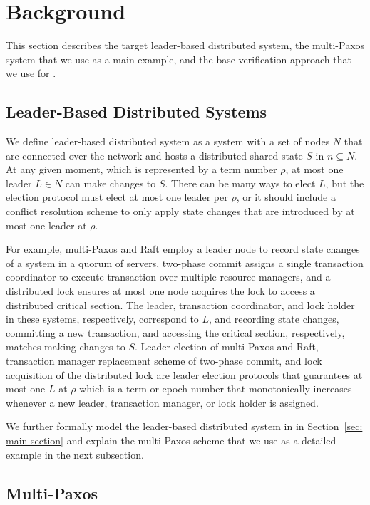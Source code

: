 \section{Background}
\label{sec:background}

This section describes the target leader-based distributed system, the
multi-Paxos system that we use as a main example, and the base
verification approach that we use for \sysname{}. 

\subsection{Leader-Based Distributed Systems}

We define leader-based distributed system as a system with a set of nodes $N$ that are
connected over the network and hosts a distributed shared state $S$ in $n
\subseteq N$. At any given moment, which is represented by a term number $\rho$,
at most one leader $L \in N$ can make changes to $S$. There can be many ways to elect
$L$, but the election protocol must elect at most one leader per $\rho$,
or it should include a conflict resolution scheme to only apply state changes
that are introduced by at most one leader at $\rho$.

For example, multi-Paxos and Raft employ a leader node to record state changes
of a system in a quorum of servers, two-phase commit assigns a single
transaction coordinator to execute transaction over multiple
resource managers, and a distributed lock ensures at most one node acquires the 
lock to access a distributed critical section.
The leader, transaction coordinator, and lock holder in
these systems, respectively, correspond to $L$, and recording state changes,
committing a new transaction, and accessing the critical section, respectively,
matches making changes to $S$. Leader election of multi-Paxos and Raft,
transaction manager replacement scheme of two-phase commit, and lock acquisition
of the distributed lock are leader election protocols that guarantees at most
one $L$ at $\rho$ which is a term or epoch number that monotonically increases
whenever a new leader, transaction manager, or lock holder is assigned. 

We further formally model the leader-based distributed system in \sysname{} in
Section~\ref{sec: main section} and explain the multi-Paxos scheme that we use
as a detailed example in the next subsection. 

\subsection{Multi-Paxos}

